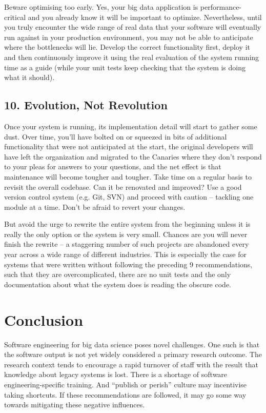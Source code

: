 \documentclass{bmcart}
\begin{document}
Beware optimising too early. Yes, your big data application is performance-critical and you already know it will be important to optimize. Nevertheless, until you truly encounter the wide range of real data that your software will eventually run against in your production environment, you may not be able to anticipate where the bottlenecks will lie. Develop the correct functionality first, deploy it and then continuously improve it using the real evaluation of the system running time as a guide (while your unit tests keep checking that the system is doing what it should). 

\subsection*{10. Evolution, Not Revolution}

Once your system is running, its implementation detail will start to gather some dust. Over time, you'll have bolted on or squeezed in bits of additional functionality that were not anticipated at the start, the original developers will have left the organization and migrated to the Canaries where they don't respond to your pleas for answers to your questions, and the net effect is that maintenance will become tougher and tougher. Take time on a regular basis to revisit the overall codebase. Can it be renovated and improved? Use a good version control system (e.g. Git, SVN) and proceed with caution -- tackling one module at a time. Don't be afraid to revert your changes. 

But avoid the urge to rewrite the entire system from the beginning unless it is really the only option or the system is very small. Chances are you will never finish the rewrite -- a staggering number of such projects are abandoned every year across a wide range of different industries. This is especially the case for systems that were written without following the preceding 9 recommendations, such that they are overcomplicated, there are no unit tests and the only documentation about what the system does is reading the obscure code. 

\section*{Conclusion}

Software engineering for big data science poses novel challenges. One such is that the software output is not yet widely considered a primary research outcome. The research context tends to encourage a rapid turnover of staff with the result that knowledge about legacy systems is lost. There is a shortage of software engineering-specific training. And ``publish or perish'' culture may incentivise taking shortcuts. If these recommendations are followed, it may go some way towards mitigating these negative influences. 
\end{document}
